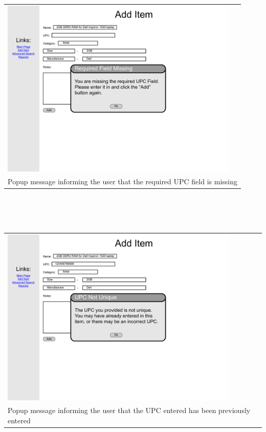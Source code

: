 \documentclass{article}
\begin{document}
\begin{tabular}{ p{4.5in} }
\includegraphics[keepaspectratio, width=4.5in]{addItemF1S5.pdf} \\
Popup message informing the user that the required UPC field is missing
\end{tabular}\\
~\\
~\\
\begin{tabular}{ p{4.5in} }
\includegraphics[keepaspectratio, width=4.5in]{addItemF2S5.pdf} \\
Popup message informing the user that the UPC entered has been previously entered
\end{tabular}\\
~\\
~\\
\end{document}
